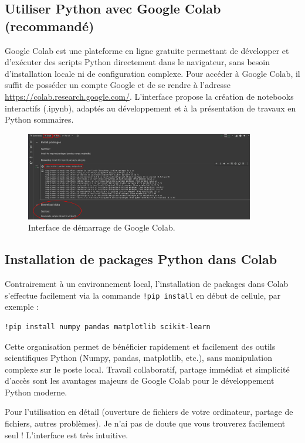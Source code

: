 \documentclass[a4paper,12pt]{article}
\begin{document}
\subsection{Utiliser Python avec Google Colab (recommandé)}

Google Colab est une plateforme en ligne gratuite permettant de développer et d’exécuter des scripts Python directement dans le navigateur, sans besoin d’installation locale ni de configuration complexe. Pour accéder à Google Colab, il suffit de posséder un compte Google et de se rendre à l’adresse \url{https://colab.research.google.com/}. L’interface propose la création de notebooks interactifs (.ipynb), adaptés au développement et à la présentation de travaux en Python sommaires.

\begin{figure}[h]
\begin{center}
\includegraphics[width=10cm]{./png/google-colab-ui}
\end{center}
\caption{Interface de démarrage de Google Colab.}
\end{figure}

\subsection{Installation de packages Python dans Colab}

Contrairement à un environnement local, l’installation de packages dans Colab s’effectue facilement via la commande \texttt{!pip install} en début de cellule, par exemple :

\begin{verbatim}
!pip install numpy pandas matplotlib scikit-learn
\end{verbatim}

Cette organisation permet de bénéficier rapidement et facilement des outils scientifiques Python (Numpy, pandas, matplotlib, etc.), sans manipulation complexe sur le poste local. Travail collaboratif, partage immédiat et simplicité d’accès sont les avantages majeurs de Google Colab pour le développement Python moderne.

Pour l'utilisation en détail (ouverture de fichiers de votre ordinateur, partage de fichiers, autres problèmes). Je n'ai pas de doute que vous trouverez facilement seul ! L'interface est très intuitive.
\end{document}
